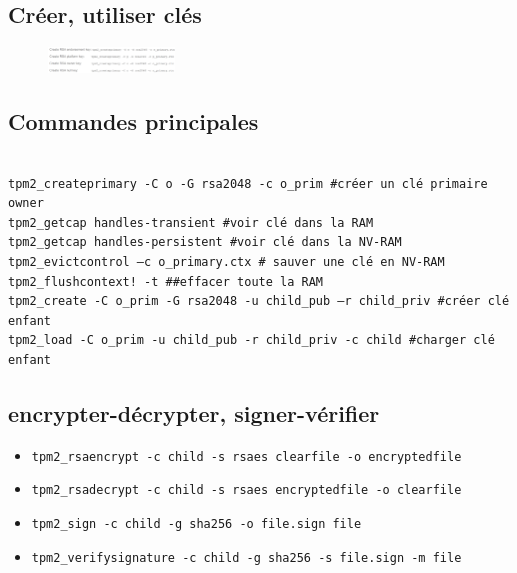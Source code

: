 \documentclass[resume]{subfiles}
\begin{document}
\subsection{Créer, utiliser clés}

\begin{figure}[H]
    \centering
    \includegraphics[width=0.3\textwidth]{Figures/TPM/createKey.png}
\end{figure}

\subsection{Commandes principales}
\begin{lstlisting}[style=bash]

tpm2_createprimary -C o -G rsa2048 -c o_prim #créer un clé primaire owner
tpm2_getcap handles-transient #voir clé dans la RAM
tpm2_getcap handles-persistent #voir clé dans la NV-RAM
tpm2_evictcontrol –c o_primary.ctx # sauver une clé en NV-RAM
tpm2_flushcontext! -t ##effacer toute la RAM
tpm2_create -C o_prim -G rsa2048 -u child_pub –r child_priv #créer clé enfant
tpm2_load -C o_prim -u child_pub -r child_priv -c child #charger clé enfant
\end{lstlisting}

\subsection{encrypter-décrypter, signer-vérifier}
\begin{itemize}
\item \verb!tpm2_rsaencrypt -c child -s rsaes clearfile -o encryptedfile!
\item \verb!tpm2_rsadecrypt -c child -s rsaes encryptedfile -o clearfile!
\item \verb!tpm2_sign -c child -g sha256 -o file.sign file!
\item \verb!tpm2_verifysignature -c child -g sha256 -s file.sign -m file!
\end{itemize}
\end{document}
